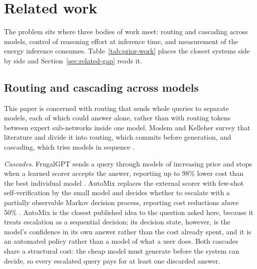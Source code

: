 \section{Related work}
\label{sec:related}

The problem sits where three bodies of work meet: routing and cascading
across models, control of reasoning effort at inference time, and
measurement of the energy inference consumes. Table~\ref{tab:prior-work}
places the closest systems side by side and
Section~\ref{sec:related-gap} reads it.

\subsection{Routing and cascading across models}
\label{sec:related-routing}

This paper is concerned with routing that sends whole queries to separate
models, each of which could answer alone, rather than with routing tokens
between expert sub-networks inside one model. Moslem and Kelleher survey that
literature and divide it into routing, which commits before generation, and
cascading, which tries models in sequence \cite{moslem2026routingsurvey}.

\emph{Cascades.} FrugalGPT sends a query through models of increasing price
and stops when a learned scorer accepts the answer, reporting up to 98\%
lower cost than the best individual model \cite{chen2023frugalgpt}. AutoMix
replaces the external scorer with few-shot self-verification by the small
model and decides whether to escalate with a partially observable Markov
decision process, reporting cost reductions above 50\%
\cite{aggarwal2024automix}. AutoMix is the closest published idea to the
question asked here, because it treats escalation as a sequential decision;
its decision state, however, is the model's confidence in its own answer
rather than the cost already spent, and it is an automated policy rather than
a model of what a user does. Both cascades share a structural cost: the cheap
model must generate before the system can decide, so every escalated query
pays for at least one discarded answer.

